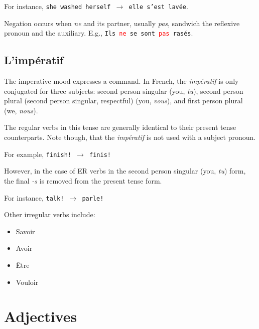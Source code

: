 \documentclass[11pt, oneside]{book}
\begin{document}
{{For instance, \texttt{she washed herself $\rightarrow$ elle s'est lav\'ee}. \vspace{0.5\baselineskip} 

Negation occurs when \textit{ne} and its partner, usually \textit{pas}, sandwich the reflexive pronoun and the auxiliary. E.g., \texttt{Ils \textcolor{red}{ne} se sont \textcolor{red}{pas} ras\'es}. \vspace{0.5\baselineskip} 

\section{L'imp\'eratif}

The imperative mood expresses a command. In French, the \textit{imp\'eratif} is only conjugated for three subjects: second person singular (you, \textit{tu}), second person plural (second person singular, respectful) (you, \textit{vous}), and first person plural (we, \textit{nous}).  \vspace{0.5\baselineskip} 

The regular verbs in this tense are generally identical to their present tense counterparts. Note though, that the \textit{imp\'eratif} is not used with a subject pronoun. \vspace{0.5\baselineskip} 

For example, \texttt{finish! $\rightarrow$ finis!} \vspace{0.5\baselineskip} 

However, in the case of ER verbs in the second person singular (you, \textit{tu}) form, the final \textit{-s} is removed from the present tense form. \vspace{0.5\baselineskip} 

For instance, \texttt{talk! $\rightarrow$ parle!} \vspace{0.5\baselineskip} 

Other irregular verbs include:  \vspace{0.5\baselineskip} 

\begin{itemize}
	\item Savoir
	\item Avoir
	\item \^Etre 
	\item Vouloir
\end{itemize}

\chapter{Adjectives}
}}
\end{document}
